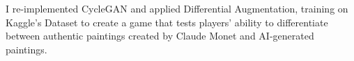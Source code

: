 \documentclass[]{CV}
\begin{document}
\begin{minipage}[t]{0.705\textwidth}
\begin{tightemize}
\end{tightemize}

\begin{tightemize}

\item I re-implemented CycleGAN and applied Differential Augmentation, training on Kaggle's Dataset to create a game that tests players' ability to differentiate between authentic paintings created by Claude Monet and AI-generated paintings.

\end{tightemize}
\sectionsep








%
%

\end{minipage} 
\hfill
\end{document}
